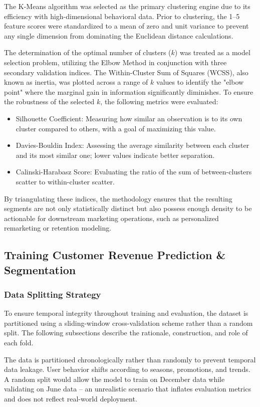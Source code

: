\documentclass[conference]{IEEEtran}
\begin{document}
The K-Means algorithm was selected as the primary clustering engine due to its efficiency with high-dimensional behavioral data. Prior to clustering, the 1--5 feature scores were standardized to a mean of zero and unit variance to prevent any single dimension from dominating the Euclidean distance calculations.

The determination of the optimal number of clusters ($k$) was treated as a model selection problem, utilizing the Elbow Method in conjunction with three secondary validation indices. The Within-Cluster Sum of Squares (WCSS), also known as inertia, was plotted across a range of $k$ values to identify the "elbow point" where the marginal gain in information significantly diminishes. To ensure the robustness of the selected $k$, the following metrics were evaluated:
\begin{itemize}
\item Silhouette Coefficient: Measuring how similar an observation is to its own cluster compared to others, with a goal of maximizing this value.
\item Davies-Bouldin Index: Assessing the average similarity between each cluster and its most similar one; lower values indicate better separation.
\item Calinski-Harabasz Score: Evaluating the ratio of the sum of between-clusters scatter to within-cluster scatter.
\end{itemize}

By triangulating these indices, the methodology ensures that the resulting segments are not only statistically distinct but also possess enough density to be actionable for downstream marketing operations, such as personalized remarketing or retention modeling.

\subsection{Training Customer Revenue Prediction \& Segmentation}
\subsubsection{Data Splitting Strategy}

To ensure temporal integrity throughout training and evaluation,
the dataset is partitioned using a sliding-window cross-validation
scheme rather than a random split. The following subsections describe
the rationale, construction, and role of each fold.

The data is partitioned chronologically rather than randomly to
prevent temporal data leakage. User behavior shifts according to
seasons, promotions, and trends. A random split would allow the
model to train on December data while validating on June data --
an unrealistic scenario that inflates evaluation metrics and does
not reflect real-world deployment.
\end{document}
